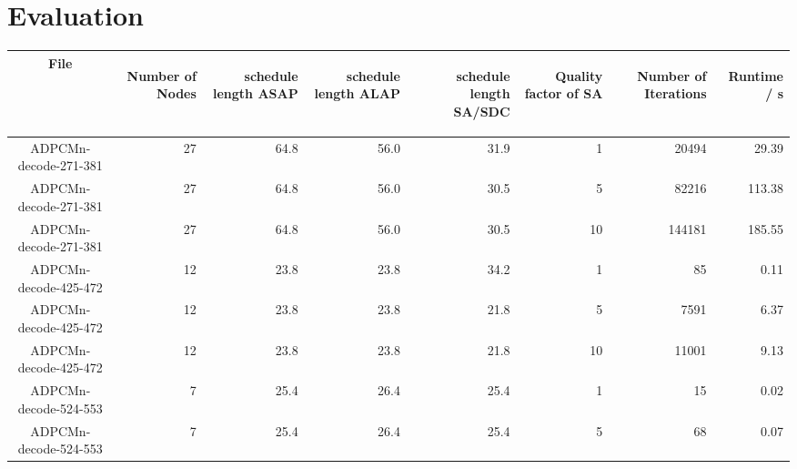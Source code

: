 \documentclass[colorback,accentcolor=tud1c,11pt]{tudreport}
\begin{document}
  \chapter{Evaluation}
  \vspace{100pt}
  \begin{tabular}{ c | r | r | r | r | r | r | r }
    File &
    \begin{rotate}{60} Number of Nodes \end{rotate} \hspace{3pt} &
    \begin{rotate}{60} schedule length ASAP \end{rotate} \hspace{10pt} &
    \begin{rotate}{60} schedule length ALAP \end{rotate} \hspace{10pt} &
    \begin{rotate}{60} schedule length SA/SDC \end{rotate} \hspace{10pt} &
    \begin{rotate}{60} Quality factor of SA \end{rotate} \hspace{3pt} &
    \begin{rotate}{60} Number of Iterations \end{rotate} \hspace{12pt} &
    \begin{rotate}{60} Runtime / s \end{rotate} \hspace{12pt} \\
   \hline
   ADPCMn-decode-271-381 & 27 & 64.8 & 56.0 & 31.9 & 1 & 20494 & 29.39 \\
   ADPCMn-decode-271-381 & 27 & 64.8 & 56.0 & 30.5 & 5 & 82216 & 113.38 \\
   ADPCMn-decode-271-381 & 27 & 64.8 & 56.0 & 30.5 & 10 & 144181 & 185.55 \\
   ADPCMn-decode-425-472 & 12 & 23.8 & 23.8 & 34.2 & 1 & 85 & 0.11 \\
   ADPCMn-decode-425-472 & 12 & 23.8 & 23.8 & 21.8 & 5 & 7591 & 6.37 \\
   ADPCMn-decode-425-472 & 12 & 23.8 & 23.8 & 21.8 & 10 & 11001 & 9.13 \\
   ADPCMn-decode-524-553 & 7 & 25.4 & 26.4 & 25.4 & 1 & 15 & 0.02 \\
   ADPCMn-decode-524-553 & 7 & 25.4 & 26.4 & 25.4 & 5 & 68 & 0.07 \\

\end{tabular}
\end{document}
